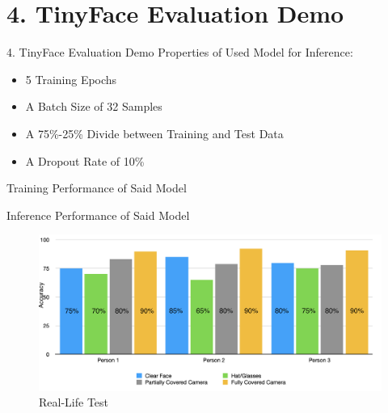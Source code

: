 \documentclass{beamer}
\begin{document}
\section{4. TinyFace Evaluation Demo} 
\begin{frame}{4. TinyFace Evaluation Demo}
Properties of Used Model for Inference:
\begin{itemize}
    \item 5 Training Epochs
    \item A Batch Size of 32 Samples
    \item A 75\%-25\% Divide between Training and Test Data
    \item A Dropout Rate of 10\%
\end{itemize}
\end{frame}
\begin{frame}{Training Performance of Said Model}
    \begin{figure}[!tbp]
        \centering
        \label{netron_sqnet}
    \end{figure}
\end{frame}
\begin{frame}{Inference Performance of Said Model}
    \begin{figure}
        \centering
        \includegraphics[height = 5 cm]{images/inference_long_test.png}
        \caption{Real-Life Test}
        \label{fig:my_label}
    \end{figure}
\end{frame}
\end{document}
